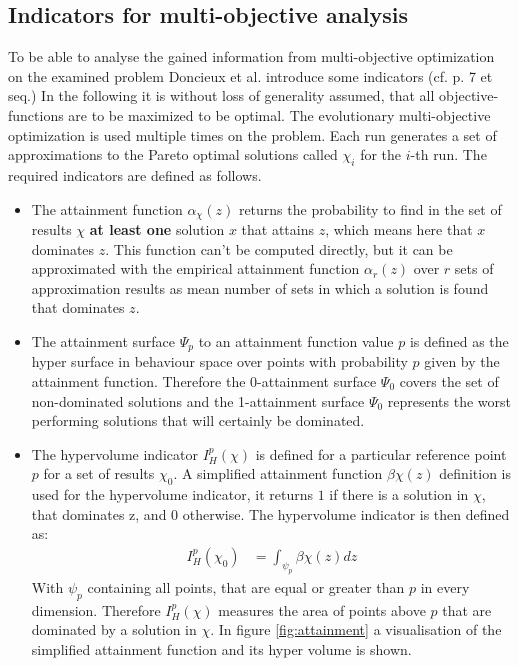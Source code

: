 \documentclass[12pt,twoside]{article}
\theoremstyle{plain}
\theoremstyle{definition}
\theoremstyle{remark}
\begin{document}
\subsection{Indicators for multi-objective analysis}
\label{back:indicators}
To be able to analyse the gained information from multi-objective optimization on the examined problem Doncieux et al. introduce some indicators (cf. \cite{doncieux2015multi} p. 7 et seq.)
In the following it is without loss of generality assumed, that all objective-functions are to be maximized to be optimal.
The evolutionary multi-objective optimization is used multiple times on the problem. Each run generates a set of approximations to the Pareto optimal solutions called $\chi_i$ for the $i$-th run.
The required indicators are defined as follows.
\begin{itemize}
	\item The attainment function $\alpha_\chi(z)$ returns the probability to find in the set of results $\chi$ \textbf{at least one} solution $x$ that attains $z$, which means here that $x$ dominates $z$. This function can't be computed directly, but it can be approximated with the empirical attainment function $\alpha_r(z)$ over $r$ sets of approximation results as mean number of sets in which a solution is found that dominates $z$.
	\item The attainment surface $\Psi_p$ to an attainment function value $p$ is defined as the hyper surface in behaviour space over points with probability $p$ given by the attainment function.
	Therefore the 0-attainment surface $\Psi_0$ covers the set of non-dominated solutions and the 1-attainment surface $\Psi_0$ represents the worst performing solutions that will certainly be dominated.
	\item The hypervolume indicator $I^p_H(\chi)$ is defined for a particular reference point $p$ for a set of results $\chi_0$. A simplified attainment function $\beta\chi(z)$ definition is used for the hypervolume indicator, it returns $1$ if there is a solution in $\chi$, that dominates z, and $0$ otherwise. The hypervolume indicator is then defined as:
	\begin{align*}
		I^p_H(\chi_0) &= \int_{\psi_p}\beta\chi(z) dz
	\end{align*}
	With $\psi_p$ containing all points, that are equal or greater than $p$ in every dimension.
	Therefore $I^p_H(\chi)$ measures the area of points above $p$ that are dominated by a solution in $\chi$.
	In figure \ref{fig:attainment} a visualisation of the simplified attainment function and its hyper volume is shown.

\end{itemize}
\end{document}
